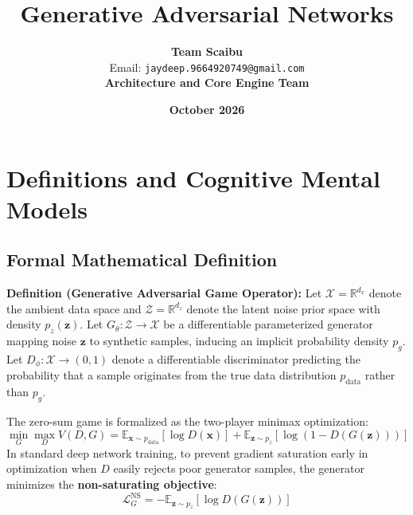 \documentclass[11pt,a4paper]{article}
\title{\textbf{Generative Adversarial Networks}}
\author{\textbf{Team Scaibu} \\ \small Email: \texttt{jaydeep.9664920749@gmail.com} \\ \small \textbf{Architecture and Core Engine Team}}
\date{\textbf{October 2026}}
\theoremstyle{definition}
\begin{document}
\maketitle

\section{Definitions and Cognitive Mental Models}

\subsection{Formal Mathematical Definition}
\textbf{Definition (Generative Adversarial Game Operator):}
Let $\mathcal{X} = \mathbb{R}^{d_x}$ denote the ambient data space and $\mathcal{Z} = \mathbb{R}^{d_z}$ denote the latent noise prior space with density $p_z(\mathbf{z})$. Let $G_\theta: \mathcal{Z} \to \mathcal{X}$ be a differentiable parameterized generator mapping noise $\mathbf{z}$ to synthetic samples, inducing an implicit probability density $p_g$. Let $D_\phi: \mathcal{X} \to (0, 1)$ denote a differentiable discriminator predicting the probability that a sample originates from the true data distribution $p_{\text{data}}$ rather than $p_g$.

The zero-sum game is formalized as the two-player minimax optimization:
{\boldmath
\begin{equation}
\min_G \max_D V(D, G) = \mathbb{E}_{\mathbf{x} \sim p_{\text{data}}}[\log D(\mathbf{x})] + \mathbb{E}_{\mathbf{z} \sim p_z}[\log(1 - D(G(\mathbf{z})))]
\end{equation}
}
In standard deep network training, to prevent gradient saturation early in optimization when $D$ easily rejects poor generator samples, the generator minimizes the \textbf{non-saturating objective}:
{\boldmath
\begin{equation}
\mathcal{L}_G^{\text{NS}} = -\mathbb{E}_{\mathbf{z} \sim p_z}[\log D(G(\mathbf{z}))]
\end{equation}
}
\end{document}
